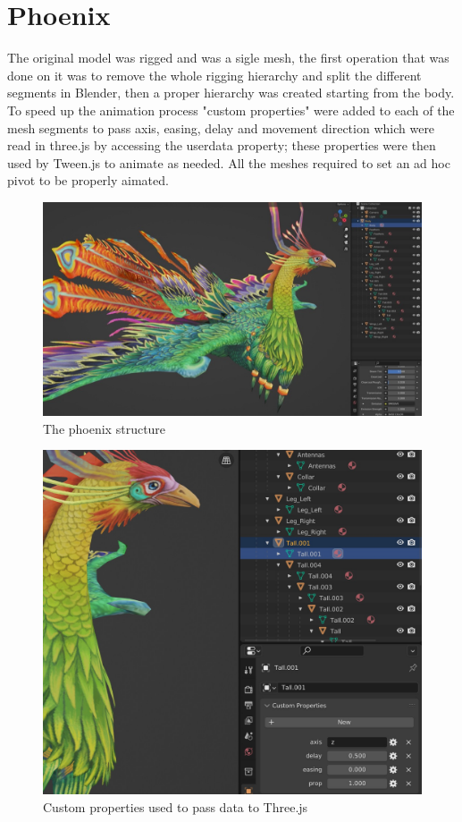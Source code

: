 \documentclass[10pt,a4paper]{article}
\begin{document}
\section{Phoenix}

The original model was rigged and was a sigle mesh, the first operation that was done on it was to remove the whole rigging hierarchy and split the different segments in Blender, then a proper hierarchy was created starting  from the body. To speed up the animation process "custom properties" were  added to each of the mesh segments to pass axis, easing, delay and movement direction which were read in three.js by accessing the userdata property; these properties were then used by Tween.js to animate as needed. All the meshes required to set an ad hoc pivot to be properly aimated.

\begin{figure}[H]
   \caption{The phoenix structure}
  \includegraphics[width=1\textwidth]{phoenix}
\end{figure}

\begin{figure}[H]
\caption{Custom properties used to pass data to Three.js}
\includegraphics[width=1\textwidth]{phoenix_data}
\end{figure}
\end{document}

